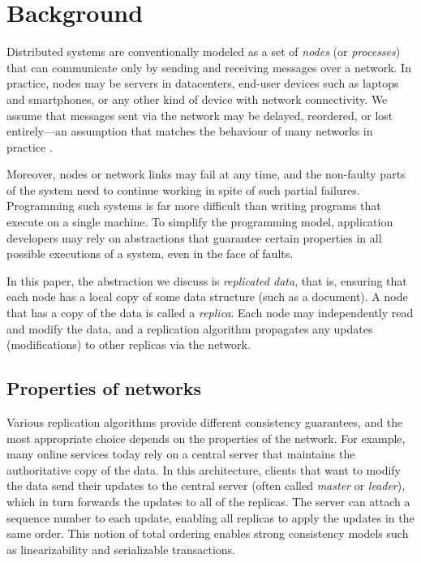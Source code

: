 \section{Background}
\label{sect.background}

Distributed systems are conventionally modeled as a set of \emph{nodes} (or \emph{processes}) that
can communicate only by sending and receiving messages over a network. In practice, nodes may be
servers in datacenters, end-user devices such as laptops and smartphones, or any other kind of
device with network connectivity. We assume that messages sent via the network may be delayed,
reordered, or lost entirely---an assumption that matches the behaviour of many networks in practice
\cite{Bailis:2014jx}.

Moreover, nodes or network links may fail at any time, and the non-faulty parts of the system need
to continue working in spite of such partial failures. Programming such systems is far more
difficult than writing programs that execute on a single machine. To simplify the programming model,
application developers may rely on abstractions that guarantee certain properties in all possible
executions of a system, even in the face of faults.

In this paper, the abstraction we discuss is \emph{replicated data}, that is, ensuring that each
node has a local copy of some data structure (such as a document). A node that has a copy of the
data is called a \emph{replica}. Each node may independently read and modify the data, and a
replication algorithm propagates any updates (modifications) to other replicas via the network.

\subsection{Properties of networks}\label{sect.background.networks}

Various replication algorithms provide different consistency guarantees, and the most appropriate
choice depends on the properties of the network. For example, many online services today rely on a
central server that maintains the authoritative copy of the data. In this architecture, clients that
want to modify the data send their updates to the central server (often called \emph{master} or
\emph{leader}), which in turn forwards the updates to all of the replicas. The server can attach a
sequence number to each update, enabling all replicas to apply the updates in the same order. This
notion of total ordering enables strong consistency models such as linearizability
\cite{Herlihy:1990jq} and serializable transactions.

